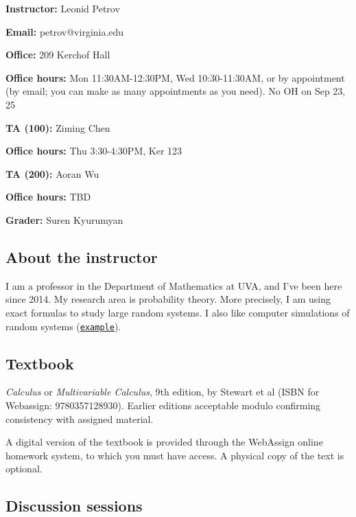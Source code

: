 \documentclass[oneside,11pt]{amsart}
\theoremstyle{definition}
\begin{document}
\parbox{.5\textwidth}{

\textbf{Instructor:} Leonid Petrov

\textbf{Email:} petrov@virginia.edu

\textbf{Office:} 209 Kerchof Hall

\textbf{Office hours:} Mon 11:30AM-12:30PM, Wed 10:30-11:30AM,
or by appointment (by email; you can make as many appointments as you need). No OH on Sep 23, 25}\hspace{30pt}
\parbox{.45\textwidth}{

\textbf{TA (100):} Ziming Chen

\textbf{Office hours:} Thu 3:30-4:30PM, Ker 123

\textbf{TA (200):} Aoran Wu

\textbf{Office hours:} TBD


\vspace{15pt}

\textbf{Grader:} Suren Kyurumyan}

\vspace{5pt}

\subsection{About the instructor}
I am a professor in the Department of Mathematics at UVA, and I've been here since 2014. My research area is probability theory. More precisely, I am using exact formulas to study large random systems. I also like computer simulations of random systems (\href{https://lpetrov.cc/simulations/2019-04-30-qvol/}{\textcolor{green!70!black}{\texttt{example}}}).

\subsection{Textbook}

\emph{Calculus} or \emph{Multivariable Calculus}, 9th edition, by Stewart et al (ISBN for Webassign: 9780357128930). Earlier editions acceptable modulo confirming consistency with assigned material.

A digital version of the textbook is provided through the WebAssign online homework system, to which you must have access. A physical copy of the text is optional. 

\subsection{Discussion sessions} 
\end{document}
